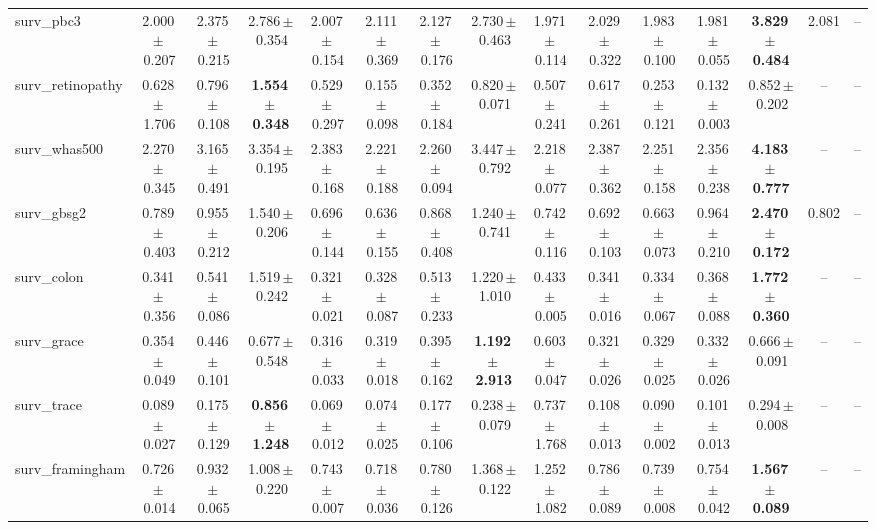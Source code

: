 \documentclass[8pt]{extarticle}
\begin{document}
\begin{longtable}{l*{14}{c}}
surv\_pbc3 & 2.000\,$\pm$\,0.207 & 2.375\,$\pm$\,0.215 & 2.786\,$\pm$\,0.354 & 2.007\,$\pm$\,0.154 & 2.111\,$\pm$\,0.369 & 2.127\,$\pm$\,0.176 & 2.730\,$\pm$\,0.463 & 1.971\,$\pm$\,0.114 & 2.029\,$\pm$\,0.322 & 1.983\,$\pm$\,0.100 & 1.981\,$\pm$\,0.055 & \textbf{3.829\,$\pm$\,0.484} & 2.081 & -- \\
surv\_retinopathy & 0.628\,$\pm$\,1.706 & 0.796\,$\pm$\,0.108 & \textbf{1.554\,$\pm$\,0.348} & 0.529\,$\pm$\,0.297 & 0.155\,$\pm$\,0.098 & 0.352\,$\pm$\,0.184 & 0.820\,$\pm$\,0.071 & 0.507\,$\pm$\,0.241 & 0.617\,$\pm$\,0.261 & 0.253\,$\pm$\,0.121 & 0.132\,$\pm$\,0.003 & 0.852\,$\pm$\,0.202 & -- & -- \\
surv\_whas500 & 2.270\,$\pm$\,0.345 & 3.165\,$\pm$\,0.491 & 3.354\,$\pm$\,0.195 & 2.383\,$\pm$\,0.168 & 2.221\,$\pm$\,0.188 & 2.260\,$\pm$\,0.094 & 3.447\,$\pm$\,0.792 & 2.218\,$\pm$\,0.077 & 2.387\,$\pm$\,0.362 & 2.251\,$\pm$\,0.158 & 2.356\,$\pm$\,0.238 & \textbf{4.183\,$\pm$\,0.777} & -- & -- \\
surv\_gbsg2 & 0.789\,$\pm$\,0.403 & 0.955\,$\pm$\,0.212 & 1.540\,$\pm$\,0.206 & 0.696\,$\pm$\,0.144 & 0.636\,$\pm$\,0.155 & 0.868\,$\pm$\,0.408 & 1.240\,$\pm$\,0.741 & 0.742\,$\pm$\,0.116 & 0.692\,$\pm$\,0.103 & 0.663\,$\pm$\,0.073 & 0.964\,$\pm$\,0.210 & \textbf{2.470\,$\pm$\,0.172} & 0.802 & -- \\
surv\_colon & 0.341\,$\pm$\,0.356 & 0.541\,$\pm$\,0.086 & 1.519\,$\pm$\,0.242 & 0.321\,$\pm$\,0.021 & 0.328\,$\pm$\,0.087 & 0.513\,$\pm$\,0.233 & 1.220\,$\pm$\,1.010 & 0.433\,$\pm$\,0.005 & 0.341\,$\pm$\,0.016 & 0.334\,$\pm$\,0.067 & 0.368\,$\pm$\,0.088 & \textbf{1.772\,$\pm$\,0.360} & -- & -- \\
surv\_grace & 0.354\,$\pm$\,0.049 & 0.446\,$\pm$\,0.101 & 0.677\,$\pm$\,0.548 & 0.316\,$\pm$\,0.033 & 0.319\,$\pm$\,0.018 & 0.395\,$\pm$\,0.162 & \textbf{1.192\,$\pm$\,2.913} & 0.603\,$\pm$\,0.047 & 0.321\,$\pm$\,0.026 & 0.329\,$\pm$\,0.025 & 0.332\,$\pm$\,0.026 & 0.666\,$\pm$\,0.091 & -- & -- \\
surv\_trace & 0.089\,$\pm$\,0.027 & 0.175\,$\pm$\,0.129 & \textbf{0.856\,$\pm$\,1.248} & 0.069\,$\pm$\,0.012 & 0.074\,$\pm$\,0.025 & 0.177\,$\pm$\,0.106 & 0.238\,$\pm$\,0.079 & 0.737\,$\pm$\,1.768 & 0.108\,$\pm$\,0.013 & 0.090\,$\pm$\,0.002 & 0.101\,$\pm$\,0.013 & 0.294\,$\pm$\,0.008 & -- & -- \\
surv\_framingham & 0.726\,$\pm$\,0.014 & 0.932\,$\pm$\,0.065 & 1.008\,$\pm$\,0.220 & 0.743\,$\pm$\,0.007 & 0.718\,$\pm$\,0.036 & 0.780\,$\pm$\,0.126 & 1.368\,$\pm$\,0.122 & 1.252\,$\pm$\,1.082 & 0.786\,$\pm$\,0.089 & 0.739\,$\pm$\,0.008 & 0.754\,$\pm$\,0.042 & \textbf{1.567\,$\pm$\,0.089} & -- & -- \\

\end{longtable}
\end{document}
